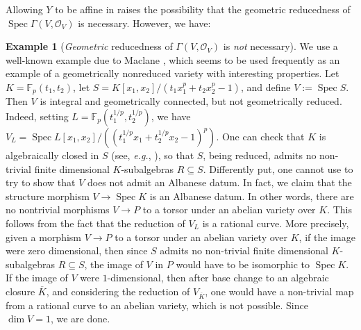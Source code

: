 \documentclass[11pt, reqno]{amsart}
\numberwithin{equation}{section}
\theoremstyle{definition}
\newtheorem{exa}[teo]{Example}
\theoremstyle{remark}
\renewcommand{\bar}[1]{{\overline{#1}}}
\DeclareMathOperator{\spec}{Spec}
\begin{document}
Allowing $Y$ to be affine in  raises the
possibility that the geometric reducedness of $\spec \Gamma(V,
\mathcal O_V)$ is necessary.  However, we have:


\begin{exa}[\emph{Geometric} reducedness of $\Gamma(V,\mathcal O_V)$ is \emph{not} necessary] \label{E:GRX}
We use a well-known example due to Maclane \cite[p.384]{maclane}, which seems to be used frequently as an example of a geometrically nonreduced variety with interesting properties.  Let  $K=\mathbb F_p(t_1,t_2)$, let $S=K[x_1,x_2]/(t_1x_1^p+t_2x_2^p-1)$, and   define $V:=\operatorname{Spec}S$.  Then $V$ is integral and geometrically connected, but not geometrically reduced.  Indeed, setting $L= \mathbb F_p(t_1^{1/p},t_2^{1/p})$, we have $V_L=\operatorname{Spec}L[x_1,x_2]/((t_1^{1/p}x_1+t_2^{1/p}x_2-1)^p)$. 
One can check that $K$ is algebraically closed in $S$ (see,
\emph{e.g.},  \cite[Exa.~6.15, p.20]{vojta}), so that $S$, being
reduced, admits no non-trivial finite dimensional $K$-subalgebras
$R\subseteq S$.  Differently put, one cannot use  to try to show that $V$ does not admit an Albanese datum. In fact,   we claim that the structure morphism $V\to \operatorname{Spec}K$ is an Albanese datum.  In other words, there are no nontrivial morphisms $V\to P$ to a torsor under an abelian variety over $K$. 
This follows from the fact that the reduction of $V_L$ is a rational curve.  More precisely,   given a morphism $V\to P$ to a torsor under an abelian variety over $K$, if the image were zero dimensional, then since
 $S$ admits no non-trivial finite dimensional $K$-subalgebras $R\subseteq S$, the image of $V$ in $P$ would have to be isomorphic to  $\operatorname{Spec} K$.  If  the image of $V$  were $1$-dimensional, then after base change to an algebraic closure $\bar K$, and considering the reduction of $V_{\bar K}$, one would have a non-trivial map from a rational curve to an abelian variety, which is not possible.  Since $\dim V=1$, we are done. 
\end{exa}
\end{document}
